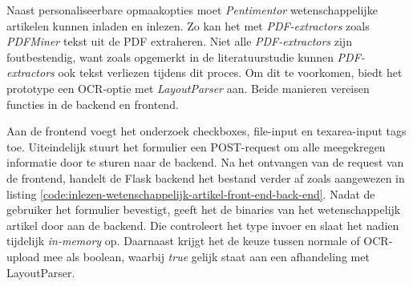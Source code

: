 Naast personaliseerbare opmaakopties moet \textit{Pentimentor} wetenschappelijke artikelen kunnen inladen en inlezen. Zo kan het met \textit{PDF-extractors} zoals \textit{PDFMiner} tekst uit de PDF extraheren. Niet alle \textit{PDF-extractors} zijn foutbestendig, want zoals opgemerkt in de literatuurstudie kunnen \textit{PDF-extractors} ook tekst verliezen tijdens dit proces. Om dit te voorkomen, biedt het prototype een OCR-optie met \textit{LayoutParser} aan. Beide manieren vereisen functies in de backend en frontend.

\medspace

Aan de frontend voegt het onderzoek checkboxes, file-input en texarea-input tags toe. Uiteindelijk stuurt het formulier een POST-request om alle meegekregen informatie door te sturen naar de backend. Na het ontvangen van de request van de frontend, handelt de Flask backend het bestand verder af zoals aangewezen in listing \ref{code:inlezen-wetenschappelijk-artikel-front-end-back-end}. Nadat de gebruiker het formulier bevestigt, geeft het de binaries van het wetenschappelijk artikel door aan de backend. Die controleert het type invoer en slaat het nadien tijdelijk \textit{in-memory} op. Daarnaast krijgt het de keuze tussen normale of OCR-upload mee als boolean, waarbij \textit{true} gelijk staat aan een afhandeling met LayoutParser.

